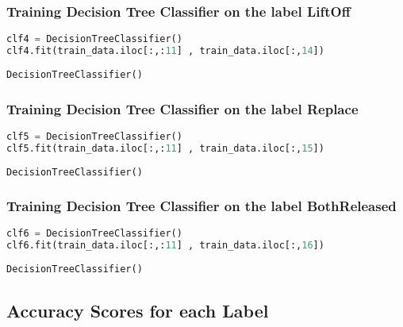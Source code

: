 \hypertarget{training-decision-tree-classifier-on-the-label-liftoff}{%
\subsubsection{Training Decision Tree Classifier on the label
LiftOff}\label{training-decision-tree-classifier-on-the-label-liftoff}}

\begin{lstlisting}[language=Python]
clf4 = DecisionTreeClassifier()
clf4.fit(train_data.iloc[:,:11] , train_data.iloc[:,14])
\end{lstlisting}

\begin{lstlisting}
DecisionTreeClassifier()
\end{lstlisting}

\hypertarget{training-decision-tree-classifier-on-the-label-replace}{%
\subsubsection{Training Decision Tree Classifier on the label
Replace}\label{training-decision-tree-classifier-on-the-label-replace}}

\begin{lstlisting}[language=Python]
clf5 = DecisionTreeClassifier()
clf5.fit(train_data.iloc[:,:11] , train_data.iloc[:,15])
\end{lstlisting}

\begin{lstlisting}
DecisionTreeClassifier()
\end{lstlisting}

\hypertarget{training-decision-tree-classifier-on-the-label-bothreleased}{%
\subsubsection{Training Decision Tree Classifier on the label
BothReleased}\label{training-decision-tree-classifier-on-the-label-bothreleased}}

\begin{lstlisting}[language=Python]
clf6 = DecisionTreeClassifier()
clf6.fit(train_data.iloc[:,:11] , train_data.iloc[:,16])
\end{lstlisting}

\begin{lstlisting}
DecisionTreeClassifier()
\end{lstlisting}

\hypertarget{accuracy-scores-for-each-label}{%
\subsection{Accuracy Scores for each
Label}\label{accuracy-scores-for-each-label}}

